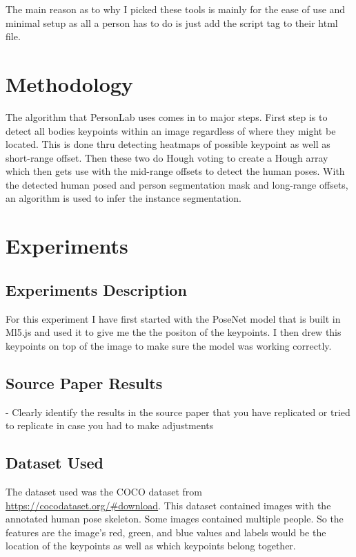 \documentclass[12pt]{extarticle}
\begin{document}
The main reason as to why I picked these tools is mainly for the ease of use and
minimal setup as all a person has to do is just add the script tag to their html file.

\section{Methodology}
The algorithm that PersonLab uses comes in to major steps. First step is to detect
all bodies keypoints within an image regardless of where they might be located.
This is done thru detecting heatmaps of possible keypoint as well as short-range offset.
Then these two do Hough voting to create a Hough array which then gets use with the mid-range
offsets to detect the human poses.
With the detected human posed and person segmentation mask and long-range offsets, an
algorithm is used to infer the instance segmentation.
\section{Experiments}

\subsection{Experiments Description}
For this experiment I have first started with the PoseNet model that is built in
Ml5.js and used it to give me the the positon of the keypoints. I then drew this keypoints
on top of the image to make sure the model was working correctly.

\subsection{Source Paper Results}
- Clearly identify the results in the source paper that you have replicated or tried to replicate in case you had to make adjustments

\subsection{Dataset Used}
The dataset used was the COCO dataset from \url{https://cocodataset.org/#download}.
This dataset contained images with the annotated human pose skeleton. Some images contained multiple people. So the features are the image's red, green, and blue values and labels would be the location of the keypoints as well as which keypoints belong together.
\end{document}
